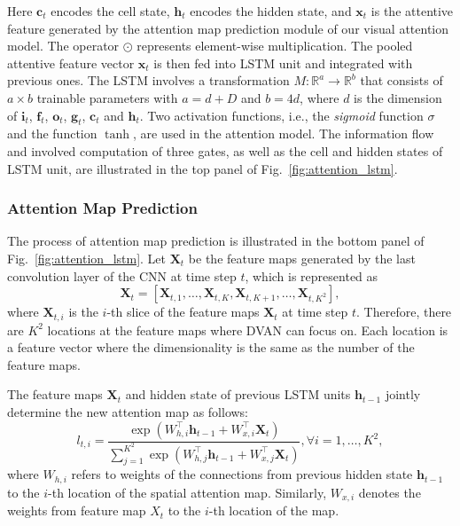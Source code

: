 \documentclass[journal]{IEEEtran}
\begin{document}
Here $\mathbf{c}_t$ encodes the cell state, $\mathbf{h}_t$ encodes the hidden state, and $\mathbf{x}_t$ is the attentive feature generated by the attention map prediction module of our visual attention model.
The operator $ \odot $ represents element-wise multiplication. The pooled attentive feature vector $\mathbf{x}_t$  is then fed into LSTM unit and integrated with previous ones. The LSTM involves a transformation $M:\mathbb{R}^a \to \mathbb{R}^b$ that consists of $a\times b$ trainable parameters with $a=d+D$ and $b=4d$, where $d$ is the dimension of $\mathbf{i}_t$, $\mathbf{f}_t$, $\mathbf{o}_t$, $\mathbf{g}_t$, $\mathbf{c}_t$ and $\mathbf{h}_t$. Two activation functions, i.e., the \emph{sigmoid} function $\sigma$ and the function $\tanh$, are used in the attention model. The information flow and involved computation of three gates, as well as the cell and hidden states of LSTM unit, are illustrated in the top panel of Fig.~\ref{fig:attention_lstm}.

\subsubsection{Attention Map Prediction}
The process of attention map prediction is illustrated in the bottom panel of Fig.~\ref{fig:attention_lstm}. Let $\mathbf{X}_t$ be the feature maps generated by the last convolution layer of the CNN at time step $t$, which is represented as
\begin{equation}
\mathbf{X}_t = [\mathbf{X}_{t,1},\ldots,\mathbf{X}_{t,K},\mathbf{X}_{t,K+1},\ldots,\mathbf{X}_{t,K^2}],
\end{equation}
where $\mathbf{X}_{t,i}$ is the $i$-th slice of the feature maps $\mathbf{X}_t$ at time step $t$. Therefore, there are $K^2$ locations at the feature maps where DVAN can focus on. Each location is a feature vector where the dimensionality is the same as the number of the feature maps.

The feature maps $\mathbf{X}_t$ and hidden state of previous LSTM units $\mathbf{h}_{t-1}$ jointly determine the new attention map as follows:
\begin{equation}
  \label{eq:attention}
   l_{t,i}   =\frac{\exp(W_{h,i}^\top \mathbf{h}_{t-1} + W_{x,i}^\top \mathbf{X}_{t})}{\sum_{j=1}^{K^2}\exp(W_{h,j}^\top \mathbf{h}_{t-1} + W_{x,j}^\top \mathbf{X}_{t})},
             \forall i = 1, \ldots, K^2,
\end{equation}
where $W_{h,i}$ refers to weights of the connections from previous hidden state $\mathbf{h}_{t-1}$ to the $i$-th location of the spatial attention map. Similarly, $W_{x,i}$ denotes the weights from feature map $X_t$ to the $i$-th location of the map.
\end{document}
